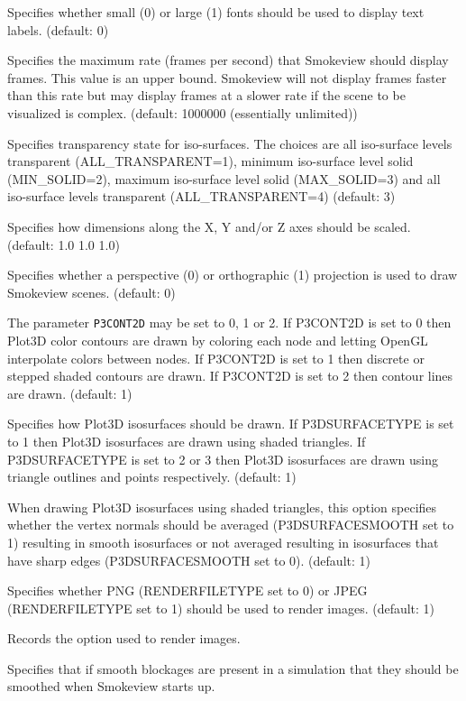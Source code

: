 \documentclass[11pt,twoside]{book}
\newcommand{\hitem}[1]{\item[{\bf #1} \hfill]}
\begin{document}
\hitem{FONTSIZE} Specifies whether small (0) or large (1)
fonts should be used to display text labels. (default: 0)

\hitem{FRAMERATEVALUE}Specifies the maximum rate (frames per
second) that Smokeview should display frames. This value is an
upper bound.  Smokeview will not display frames faster than this
rate but may display frames at a slower rate if the scene to be
visualized is complex. (default: 1000000 (essentially unlimited))

\hitem{ISOTRANS}Specifies transparency state for iso-surfaces. The choices
are all iso-surface levels transparent (ALL\_TRANSPARENT=1), minimum
iso-surface level solid (MIN\_SOLID=2), maximum iso-surface level solid (MAX\_SOLID=3)
and all iso-surface levels transparent (ALL\_TRANSPARENT=4) (default: 3)

\hitem{MSCALE} Specifies how dimensions along the X, Y
and/or Z axes should be scaled. (default: 1.0 1.0 1.0)

\hitem{PROJECTION} Specifies whether a perspective (0) or orthographic (1) projection
is used to draw Smokeview scenes.
(default: 0)

\hitem{P3CONT2D}The parameter {\tt P3CONT2D} may be set to 0, 1 or
2.  If P3CONT2D is set to 0 then Plot3D color contours are drawn
by coloring each node and letting OpenGL interpolate colors
between nodes.  If P3CONT2D is set to 1 then discrete or stepped
shaded contours are drawn.  If P3CONT2D is set to 2 then contour
lines are drawn. (default: 1)

\hitem{P3DSURFACETYPE}Specifies how Plot3D isosurfaces should be
drawn.  If P3DSURFACETYPE is set to 1 then Plot3D isosurfaces are
drawn using shaded triangles.  If P3DSURFACETYPE is set to 2 or 3
then Plot3D isosurfaces are drawn using triangle outlines and
points respectively. (default: 1)

\hitem{P3DSURFACESMOOTH}When drawing Plot3D isosurfaces using
shaded triangles, this option specifies whether the vertex normals
should be averaged (P3DSURFACESMOOTH set to 1) resulting in smooth
isosurfaces or not averaged resulting in isosurfaces that have
sharp edges (P3DSURFACESMOOTH set to 0). (default: 1)

\hitem{RENDERFILETYPE}Specifies whether PNG (RENDERFILETYPE set to 0) or
JPEG (RENDERFILETYPE set to 1)
should be used to render images.  (default: 1)

\hitem{RENDEROPTION} Records the option used to render images.

\hitem{SBATSTART} Specifies that if smooth blockages are present in a
simulation that they should be
smoothed when Smokeview starts up.
\end{document}
